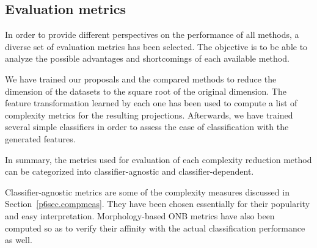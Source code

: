 \begin{table}[ht]
  \centering
  \caption{\label{p6tbl.methods}Brief description of each method available in the experiments}
\end{table}

\subsection{Evaluation metrics}

In order to provide different perspectives on the performance of all methods, a diverse set of evaluation metrics has been selected. The objective is to be able to analyze the possible advantages and shortcomings of each available method.

We have trained our proposals and the compared methods to reduce the dimension of the datasets to the square root of the original dimension. The feature transformation learned by each one has been used to compute a list of complexity metrics for the resulting projections. Afterwards, we have trained several simple classifiers in order to assess the ease of classification with the generated features.

In summary, the metrics used for evaluation of each complexity reduction method can be categorized into classifier-agnostic and classifier-dependent.

Classifier-agnostic metrics are some of the complexity measures discussed in Section~\ref{p6sec.compmeas}. They have been chosen essentially for their popularity and easy interpretation. Morphology-based ONB metrics have also been computed so as to verify their affinity with the actual classification performance as well. %

